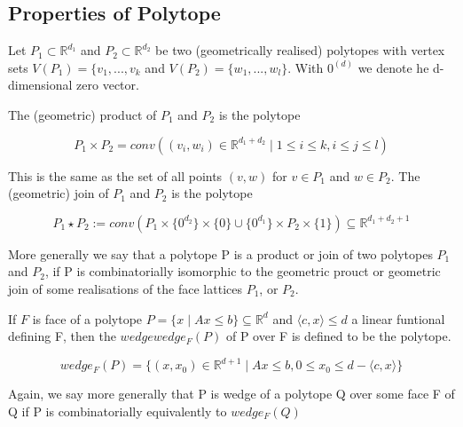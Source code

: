 \subsection{Properties of Polytope}
Let $P_1 \subset \mathbb{R}^{d_1}$ and $P_2 \subset \mathbb{R}^{d_2}$ be two (geometrically realised) polytopes with vertex sets $V(P_1)=\{ v_1,...,v_k$ and $V(P_2)=\{ w_1,...,w_l \}$. With $0^{(d)}$ we denote he d-dimensional zero vector.

The (geometric) product of $P_1$ and $P_2$ is the polytope

\begin{equation}
P_1 \times P_2 = conv( (v_i,w_i)\in \mathbb{R}^{d_1+d_2}\mid 1\leq i \leq k, i \leq j \leq l)
\label{eqn:Einstein}
\end{equation}

This is the same as the set of all points $(v,w)$ for $v \in P_1$ and $w \in P_2$. The (geometric) join of $P_1$ and $P_2$ is the polytope

\begin{equation}
P_1 \star P_2 := conv(P_1 \times \{ 0^{d_2} \} \times \{ 0 \} \cup \{ 0^{d_1} \} \times P_2 \times \{ 1 \} ) \subseteq \mathbb{R}^{d_1+d_2+1}
\label{eqn:Einstein}
\end{equation}

More generally we say that a polytope P is a product or join of two polytopes $P_1$ and $P_2$, if P is combinatorially isomorphic to the geometric prouct or geometric join of some realisations of the face lattices $P_1$, or $P_2$.

If $F$ is face of a polytope  $P = \{ x \mid Ax \leq b \} \subseteq \mathbb{R}^d$  and $ \langle c,x \rangle \leq d $ a linear funtional defining F, then the $wedge wedge_F(P)$ of P over F is defined to be the polytope.
 
\begin{equation}
wedge_F(P) = \{ (x,x_0) \in \mathbb{R}^{d+1} \mid Ax\leq b, 0\leq x_0 \leq d- \langle c,x \rangle\}
\label{eqn:Einstein}
\end{equation}

Again, we say more generally that P is wedge of a polytope  Q over some face F of Q if P is combinatorially equivalently to $wedge_F(Q)$




